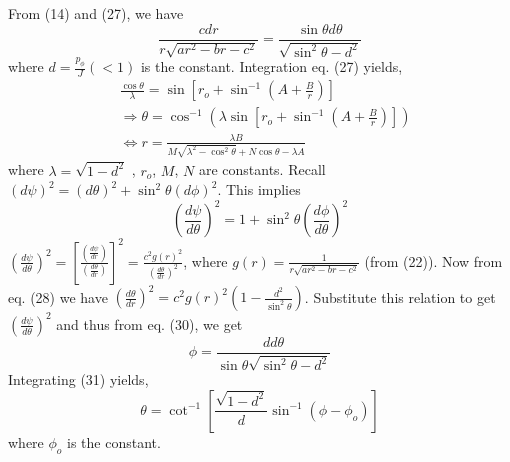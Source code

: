 \documentclass[conference]{IEEEtran}
\begin{document}
From (14) and (27), we have \begin{dmath} \frac{c dr}{r\sqrt{ar^{2} - br - c^{2}}} = \frac{\sin{\theta} d\theta}{\sqrt{\sin^{2}{\theta} - d^{2}}}\end{dmath} where $d = \frac{p_{\phi}}{J} \left( < 1\right)$ is the constant. 
Integration eq. (27) yields, 
\begin{equation}
    \begin{split}
 &\frac{\cos{\theta}}{\lambda} = \sin{\left[r_{o} + \sin^{-1}{\left(A + \frac{B}{r}\right)}\right]} \\
 &\Rightarrow \theta = \cos^{-1}\left({\lambda\sin{\left[r_{o} + \sin^{-1}{\left(A + \frac{B}{r}\right)}\right]}}\right) \\
 &\Longleftrightarrow r = \frac{\lambda B}{M\sqrt{\lambda^{2} - \cos^{2}{\theta}} + N\cos{\theta} - \lambda A}
 \end{split}
 \end{equation} where $\lambda = \sqrt{1 - d^{2}}$ , $r_{o}$, $M$, $N$ are constants. 
Recall $\left(d\psi\right)^{2} = \left(d\theta\right)^{2} + \sin^{2}{\theta}\left(d\phi\right)^{2}$. This implies \begin{dmath}\left(\frac{d\psi}{d \theta}\right)^{2} = 1 + \sin^{2}{\theta}\left(\frac{d\phi}{d \theta}\right)^{2}\end{dmath} 
$\left(\frac{d\psi}{d \theta}\right)^{2} = \left[\frac{\left(\frac{d\psi}{d r}\right)}{\left(\frac{d\theta}{d r}\right)}\right]^{2} = \frac{c^{2}g(r)^{2}}{\left(\frac{d\theta}{d r}\right)^{2}}$, where $g(r) = \frac{1}{r\sqrt{ar^{2} - br - c^{2}}}$ (from (22)). Now from eq. (28) we have $\left(\frac{d\theta}{d r}\right)^{2} = c^{2}g(r)^{2}\left(1 - \frac{d^{2}}{\sin^{2}{\theta}}\right)$. Substitute this relation to get $\left(\frac{d\psi}{d \theta}\right)^{2}$ and thus from eq. (30), we get \begin{dmath} \phi =  \frac{d  d\theta}{\sin{\theta}{\sqrt{\sin^{2}{\theta} - d^{2}}}}\end{dmath} Integrating (31) yields, \begin{equation}\theta = \cot^{-1}{\left[\frac{\sqrt{1 - d^{2}}}{d}\sin^{-1}{\left(\phi - \phi_{o} \right)}\right]}\end{equation} where $\phi_{o}$ is the constant.
\vspace{1em}
\end{document}

